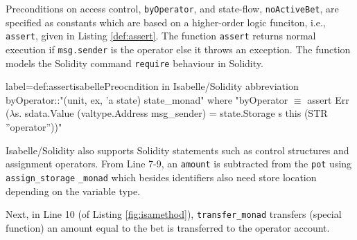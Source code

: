 \documentclass[a4paper,UKenglish,cleveref, autoref, thm-restate]{oasics-v2021}
\begin{document}
%
%
%
%
%
Preconditions on access control, \texttt{byOperator}, and state-flow, \texttt{noActiveBet}, are specified as constants which are based on a higher-order logic funciton, i.e., \texttt{assert}, given in Listing \ref{def:assert}. 
%
The function \texttt{assert} returns normal execution if \texttt{msg.sender} is the operator else it throws an exception.
%
The function models the Solidity command \texttt{\color{blue}require} behaviour in Solidity.
%

%
\begin{code}{label={def:assert}}{isabelle}{Preocndition in Isabelle/Solidity}
abbreviation byOperator::"(unit, ex, 'a state) state_monad" where
 "byOperator $\equiv$ assert Err ($\lambda$s. sdata.Value (valtype.Address msg_sender)
			 = state.Storage s this (STR ''operator''))"
\end{code}

Isabelle/Solidity also supports Solidity statements such as control structures and assignment operators. 
%
From Line 7-9, an \texttt{amount} is subtracted from the \texttt{pot} using \texttt{assign\_storage} \texttt{\_monad} which besides identifiers also need store location depending on the variable type.
%

%
Next, 
%
in Line 10 (of Listing \ref{fig:isamethod}), \texttt{transfer\_monad} transfers (special function) an amount  equal to the bet is transferred to the operator account.
\end{document}
